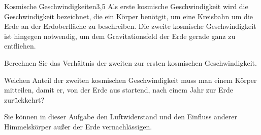 


\begin{problem}{Kosmische Geschwindigkeiten}{3,5}
Als erste kosmische Geschwindigkeit wird die Geschwindigkeit bezeichnet, die ein Körper benötgit, um eine Kreisbahn um die Erde an der Erdoberfläche zu beschreiben.  Die zweite kosmische Geschwindigkeit ist hingegen notwendig, um dem Gravitationsfeld der Erde gerade ganz zu entfliehen.
\begin{abcenum}
  \item Berechnen Sie das Verhältnis der zweiten zur ersten kosmischen Geschwindigkeit.
  \item Welchen Anteil der zweiten kosmischen Geschwindigkeit muss man einem Körper mitteilen, damit er, von der Erde aus startend, nach einem Jahr zur Erde zurückkehrt?
\end{abcenum}

Sie können in dieser Aufgabe den Luftwiderstand und den Einfluss anderer Himmelskörper außer der Erde vernachlässigen.


\end{problem}
